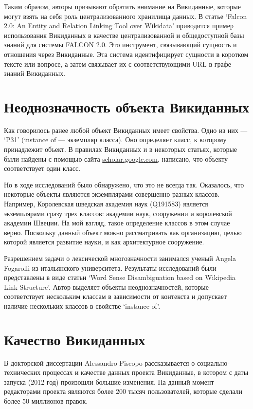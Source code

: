 Таким образом, авторы призывают обратить внимание на Викиданные, которые могут взять на себя роль централизованного хранилища данных. В статье ‘Falcon 2.0: An Entity
and Relation Linking Tool over Wikidata’\cite{Falcon_2.0} приводится пример использования Викиданных в качестве централизованной и общедоступной базы знаний для системы FALCON 2.0. Это инструмент, связывающий сущность и отношения через Викиданные. Эта система идентифицирует сущности в коротком тексте или вопросе, а затем связывает их с соответствующими URL в графе знаний Викиданных.
\section{Неоднозначность объекта Викиданных}
Как говорилось ранее любой объект Викиданных имеет свойства. Одно из них --- ‘P31’ (instance of --- экземпляр класса). Оно определяет класс, к которому принадлежит объект. В правилах Викиданных и в некоторых статьях\cite{BabelNet}, которые были найдены с помощью сайта \href{scholar.google.com}{scholar.google.com}\cite{GoogleAcademy}, написано, что объекту соответствует один класс.

Но в ходе исследований было обнаружено, что это не всегда так. Оказалось, что некоторые объекты являются экземплярами совершенно разных классов. Например, Королевская шведская академия наук (Q191583) является экземплярами сразу трех классов: академии наук, сооружении и королевской академии Швеции. На мой взгляд, такое определение классов в этом случае верно. Поскольку данный объект можно рассматривать как организацию, целью которой является развитие науки, и как архитектурное сооружение. 

Разрешением задачи о лексической многозначности занимался ученый Angela Fogarolli из итальянского университета. Результаты исследований были представлены в виде статьи ‘Word Sense Disambiguation based on Wikipedia Link Structure’\cite{Fogarolli}. Автор выделяет объекты неоднозначностей, которые соответствует нескольким классам в зависимости от контекста и допускает наличие нескольких классов в свойстве ‘instance of’.
\section{Качество Викиданных}
В докторской диссертации Alessandro Piscopo\cite{Piscopo} рассказывается о социально-технических процессах и качестве данных проекта Викиданные, в котором с даты запуска (2012 год) произошли большие изменения. На данный момент редакторами проекта являются более 200 тысяч пользователей, которые сделали более 50 миллионов правок.

